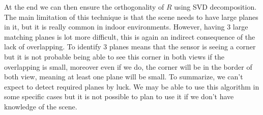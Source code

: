 At the end we can then ensure the orthogonality of $R$ using SVD decomposition. \\

The main limitation of this technique is that the scene needs to have large planes in it, but it is really common in indoor environments. However, having 3 large matching planes is lot more difficult, this is again an indirect consequence of the lack of overlapping. To identify 3 planes means that the sensor is seeing a corner but it is not probable being able to see this corner in both views if the overlapping is small, moreover even if we do, the corner will be in the border of both view, meaning at least one plane will be small. To summarize, we can't expect to detect required planes by luck. We may be able to use this algorithm in some specific cases but it is not possible to plan to use it if we don't have knowledge of the scene.